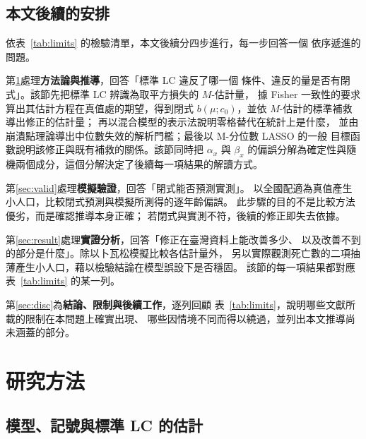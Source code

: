 \documentclass[UTF8, fontset=macnew, a4paper, 12pt]{ctexart}
\begin{document}
\subsection{本文後續的安排}\label{sec:roadmap}

依表~\ref{tab:limits} 的檢驗清單，本文後續分四步進行，每一步回答一個
依序遞進的問題。

第\ref{sec:method}處理\textbf{方法論與推導}，回答「標準 LC 違反了哪一個
條件、違反的量是否有閉式」。該節先把標準 LC 辨識為取平方損失的 $M$-估計量，
據 Fisher 一致性的要求算出其估計方程在真值處的期望，得到閉式
$b(\mu;c_0)$，並依 $M$-估計的標準補救導出修正的估計量；
再以混合模型的表示法說明零格替代在統計上是什麼，
並由崩潰點理論導出中位數失效的解析門檻；最後以 M-分位數 LASSO 的一般
目標函數說明該修正與既有補救的關係。該節同時把 $\alpha_x$ 與 $\beta_x$
的偏誤分解為確定性與隨機兩個成分，這個分解決定了後續每一項結果的解讀方式。

第\ref{sec:valid}處理\textbf{模擬驗證}，回答「閉式能否預測實測」。
以全國配適為真值產生小人口，比較閉式預測與模擬所測得的逐年齡偏誤。
此步驟的目的不是比較方法優劣，而是確認推導本身正確；
若閉式與實測不符，後續的修正即失去依據。

第\ref{sec:result}處理\textbf{實證分析}，回答「修正在臺灣資料上能改善多少、
以及改善不到的部分是什麼」。除以卜瓦松模擬比較各估計量外，
另以實際觀測死亡數的二項抽薄產生小人口，藉以檢驗結論在模型誤設下是否穩固。
該節的每一項結果都對應表~\ref{tab:limits} 的某一列。

第\ref{sec:disc}為\textbf{結論、限制與後續工作}，逐列回顧
表~\ref{tab:limits}，說明哪些文獻所載的限制在本問題上確實出現、
哪些因情境不同而得以繞過，並列出本文推導尚未涵蓋的部分。

\section{研究方法}\label{sec:method}

\subsection{模型、記號與標準 LC 的估計}
\end{document}

